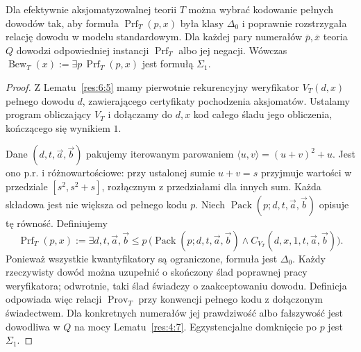\begin{lemat}\label{res:7:7}
Dla efektywnie aksjomatyzowalnej teorii $T$ można wybrać kodowanie pełnych dowodów tak, aby formuła $\operatorname{Prf}_T(p,x)$ była klasy $\Delta_0$ i poprawnie rozstrzygała relację dowodu w modelu standardowym. Dla każdej pary numerałów $\overline p,\overline x$ teoria $Q$ dowodzi odpowiedniej instancji $\operatorname{Prf}_T$ albo jej negacji. Wówczas $\operatorname{Bew}_T(x):=\exists p\,\operatorname{Prf}_T(p,x)$ jest formułą $\Sigma_1$.
\end{lemat}
\begin{proof}
Z Lematu~\ref{res:6:5} mamy pierwotnie rekurencyjny weryfikator $V_T(d,x)$ pełnego dowodu $d$, zawierającego certyfikaty pochodzenia aksjomatów. Ustalamy program obliczający $V_T$ i dołączamy do $d,x$ kod całego śladu jego obliczenia, kończącego się wynikiem $1$.

Dane $(d,t,\vec a,\vec b)$ pakujemy iterowanym parowaniem
$\langle u,v\rangle=(u+v)^2+u$. Jest ono p.r. i różnowartościowe: przy ustalonej sumie $u+v=s$ przyjmuje wartości w przedziale $[s^2,s^2+s]$, rozłącznym z przedziałami dla innych sum. Każda składowa jest nie większa od pełnego kodu $p$. Niech $\operatorname{Pack}(p;d,t,\vec a,\vec b)$ opisuje tę równość. Definiujemy
\[
\operatorname{Prf}_T(p,x):=\exists d,t,\vec a,\vec b\le p\,
\bigl(\operatorname{Pack}(p;d,t,\vec a,\vec b)\land
C_{V_T}(d,x,1,t,\vec a,\vec b)\bigr).
\]
Ponieważ wszystkie kwantyfikatory są ograniczone, formuła jest $\Delta_0$. Każdy rzeczywisty dowód można uzupełnić o skończony ślad poprawnej pracy weryfikatora; odwrotnie, taki ślad świadczy o zaakceptowaniu dowodu. Definicja odpowiada więc relacji $\operatorname{Prov}_T$ przy konwencji pełnego kodu z dołączonym świadectwem. Dla konkretnych numerałów jej prawdziwość albo fałszywość jest dowodliwa w $Q$ na mocy Lematu~\ref{res:4:7}. Egzystencjalne domknięcie po $p$ jest $\Sigma_1$.
\end{proof}

